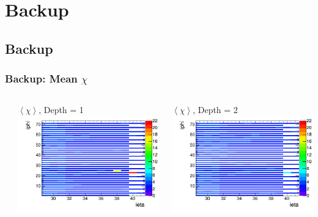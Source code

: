 \documentclass[bigger]{beamer}
\begin{document}
\section{Backup}
\label{sec-5}
\subsection{Backup}
\label{sec-5-1}
\begin{frame}
\frametitle{Backup: Mean $\chi$}
\label{sec-5-1-1}
\begin{columns} %
\label{sec-5-1-1-1}
\begin{column}{0.55\textwidth}
\label{sec-5-1-1-1-1}

\centering
$\left<\chi\right>$, Depth = 1 \\
\includegraphics[width=\textwidth]{fig/mean_fit_amp_over_significance_depth1_hist.png}
\end{column}
\begin{column}{0.55\textwidth}
\label{sec-5-1-1-1-2}

\centering
$\left<\chi\right>$, Depth = 2 \\
\includegraphics[width=\textwidth]{fig/mean_fit_amp_over_significance_depth2_hist.png}
\end{column}
\end{columns}
\begin{itemize}


\end{itemize}
\end{frame}
\end{document}
